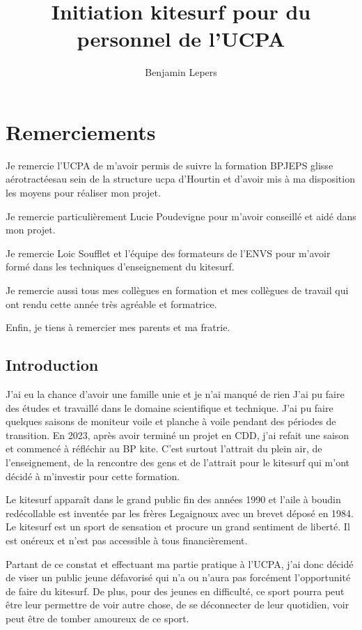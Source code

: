 \documentclass[12pt,a4paper]{report}
\begin{document}
\author{Benjamin Lepers}
\title{Initiation kitesurf pour du personnel de l'UCPA}
\maketitle
\chapter*{Remerciements}
Je remercie l'UCPA de m'avoir permis de suivre la formation BPJEPS glisse
aérotractéesau sein de la structure ucpa d'Hourtin et d'avoir mis
à ma disposition les moyens pour réaliser mon projet.

Je remercie particulièrement Lucie Poudevigne pour m'avoir conseillé et
aidé dans mon projet.

Je remercie Loic Soufflet et l'équipe des formateurs de l'ENVS pour 
m'avoir formé dans les techniques d'enseignement du kitesurf.

Je remercie aussi tous mes collègues en formation et mes collègues 
de travail qui ont rendu cette année très agréable et formatrice.

Enfin, je tiens à remercier mes parents et ma fratrie.


\tableofcontents
\newpage
\section{Introduction}
J'ai eu la chance d'avoir une famille unie et je n'ai manqué de rien
J'ai pu faire des études et  travaillé dans le domaine
scientifique et technique. J'ai pu  faire quelques 
saisons de moniteur voile et planche à voile pendant des périodes 
de transition.
En 2023, après avoir terminé un projet
en CDD, j'ai refait une saison et commencé à réfléchir au BP kite.
C'est surtout l'attrait du plein air, de l'enseignement, de la rencontre
des gens et de l'attrait pour le kitesurf qui m'ont décidé à m'investir
pour cette formation.

Le kitesurf apparaît dans le grand public fin des années 1990 et
l'aile à boudin redécollable est inventée par les frères Legaignoux avec 
un brevet déposé en 1984\cite{brevet_kite}.
Le kitesurf est un sport de sensation et procure un grand
sentiment de liberté. Il est onéreux et n'est pas accessible à tous
financièrement.

Partant de ce constat et effectuant ma partie pratique à l'UCPA\cite{ucpa}, j'ai 
donc décidé de viser un public jeune défavorisé qui n'a  ou n'aura
pas forcément l'opportunité de faire du kitesurf. 
De plus, pour des jeunes en difficulté, ce sport pourra peut être 
leur permettre de voir autre chose, de se déconnecter de leur quotidien,
voir peut être de tomber amoureux de ce sport.
\end{document}
